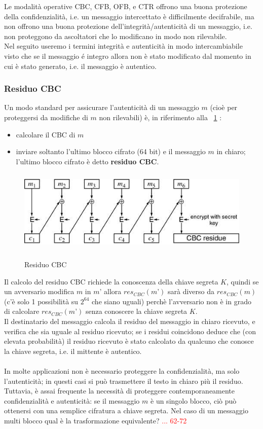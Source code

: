 Le modalità operative CBC, CFB, OFB, e CTR offrono una buona protezione della confidenzialità, i.e. un messaggio intercettato è difficilmente decifrabile, ma non offrono una buona protezione dell'integrità/autenticità di un messaggio, i.e. non proteggono da ascoltatori che lo modificano in modo non rilevabile.\\
Nel seguito useremo i termini integrità e autenticità in modo intercambiabile visto che se il messaggio é integro allora non è stato modificato dal momento in cui è stato generato, i.e. il messaggio è autentico.
\subsubsection{Residuo CBC}
Un modo standard per assicurare l'autenticità di un messaggio $m$ (cioè per proteggersi da modifiche di $m$ non rilevabili) è, in riferimento alla \figurename ~\ref{fig:residuo_CBC} :
\begin{itemize}
\item calcolare il CBC di $m$
\item inviare soltanto l'ultimo blocco cifrato (64 bit) e il messaggio $m$ in chiaro; l'ultimo blocco cifrato è detto \textbf{residuo CBC}.
\end{itemize}
\begin{figure}[htbp]
	\centering%
	\subfigure%
	{\includegraphics[height=4cm, width=12cm, keepaspectratio]{Immagini/Capitolo3/residuo_CBC.png}}
	\caption{Residuo CBC \label{fig:residuo_CBC}} 	
\end{figure}
Il calcolo del residuo CBC richiede la conoscenza della chiave segreta $K$, quindi se un avversario modifica $m$ in $m’$ allora $res_{CBC}(m’)$ sarà diverso da $res_{CBC}(m)$ (c'è solo 1 possibilità su $2^64$ che siano uguali) perchè l'avversario non è in grado di calcolare $res_{CBC}(m’)$ senza conoscere la chiave segreta $K$. \\
Il destinatario del messaggio calcola il residuo del messaggio in chiaro ricevuto, e verifica che sia uguale al residuo ricevuto; se i residui coincidono deduce che (con elevata probabilità) il residuo ricevuto è stato calcolato da qualcuno che conosce la chiave segreta, i.e. il mittente è autentico.\\
\\
In molte applicazioni non è necessario proteggere la confidenzialità, ma solo l'autenticità; in questi casi si può trasmettere il testo in chiaro più il residuo. Tuttavia, è assai frequente la necessità di
proteggere contemporaneamente confidenzialità e autenticità: se il messaggio $m$ è un singolo blocco, ciò può ottenersi con una semplice cifratura a chiave segreta. Nel caso di un messaggio multi blocco qual è la
trasformazione equivalente?
\textcolor{red}{... 62-72}
